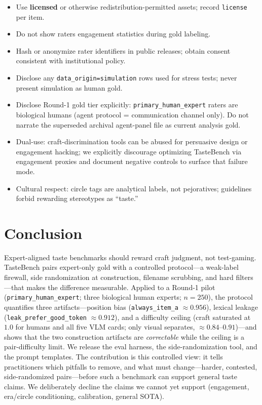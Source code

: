 \documentclass[11pt,a4paper]{article}
\begin{document}
\begin{itemize}[leftmargin=*,itemsep=2pt]
  \item Use \textbf{licensed} or otherwise redistribution-permitted assets; record \texttt{license} per item.
  \item Do not show raters engagement statistics during gold labeling.
  \item Hash or anonymize rater identifiers in public releases; obtain consent consistent with institutional policy.
  \item Disclose any \texttt{data\_origin=simulation} rows used for stress tests; never present simulation as human gold.
  \item Disclose Round-1 gold tier explicitly: \texttt{primary\_human\_expert} raters are biological humans (agent protocol = communication channel only). Do not narrate the superseded archival agent-panel file as current analysis gold.
  \item Dual-use: craft-discrimination tools can be abused for persuasive design or engagement hacking; we explicitly discourage optimizing TasteBench via engagement proxies and document negative controls to surface that failure mode.
  \item Cultural respect: circle tags are analytical labels, not pejoratives; guidelines forbid rewarding stereotypes as ``taste.''
\end{itemize}

\section{Conclusion}
\label{sec:conclusion}

Expert-aligned taste benchmarks should reward craft judgment, not test-gaming. TasteBench pairs expert-only gold with a controlled protocol---a weak-label firewall, side randomization at construction, filename scrubbing, and hard filters---that makes the difference measurable. Applied to a Round-1 pilot (\texttt{primary\_human\_expert}; three biological human experts; $n=250$), the protocol quantifies three artifacts---position bias (\texttt{always\_item\_a} $\approx 0.956$), lexical leakage (\texttt{leak\_prefer\_good\_token} $\approx 0.912$), and a difficulty ceiling (craft saturated at $1.0$ for humans and all five VLM cards; only visual separates, $\approx 0.84$--$0.91$)---and shows that the two construction artifacts are \emph{correctable} while the ceiling is a pair-difficulty limit. We release the eval harness, the side-randomization tool, and the prompt templates. The contribution is this controlled view: it tells practitioners which pitfalls to remove, and what must change---harder, contested, side-randomized pairs---before such a benchmark can support general taste claims. We deliberately decline the claims we cannot yet support (engagement, era/circle conditioning, calibration, general SOTA).
\end{document}

